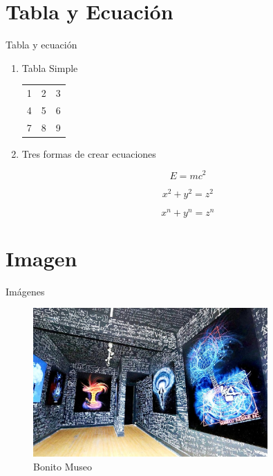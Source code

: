 \documentclass[a4paper,10pt]{beamer}
\begin{document}
\section{Tabla y Ecuaci\'on}
\begin{frame}{Tabla y ecuaci\'on}


  
\begin{enumerate}
 \item Tabla Simple
 
\begin{center}
 \begin{tabular}{l c r } 
	    1 & 2 & 3 %
	    \\ 4 & 5 & 6  %
	    \\ 7 & 8 & 9 \\ %
\end{tabular}
\end{center}

 \item Tres formas de crear ecuaciones

\begin{equation}
E = mc^2
\end{equation}

$$
x^2 + y^2 = z^2
$$

\[ x^n + y^n = z^n \]
\end{enumerate}


\end{frame}

\section{Imagen}
\begin{frame}{Im\'agenes}
\begin{figure}[h]
 \centering 
 \includegraphics[width=0.8\textwidth]{1}
 \captionsetup[figura]{name=Figura}
 \caption{Bonito Museo}
\end{figure}

\end{frame}
\end{document}

